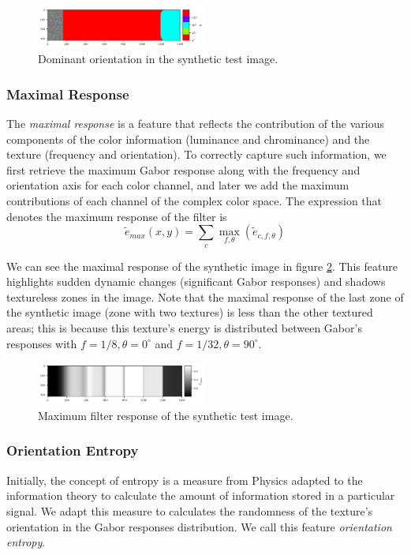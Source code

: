 \documentclass[journal]{IEEEtran}
\begin{document}
\begin{figure}[!ht]
	\includegraphics[width=0.5\textwidth]{dom_orient_synth}
    \caption{Dominant orientation in the synthetic test image.}
    \label{fig:dom_orient_synth}
\end{figure}

\subsubsection{Maximal Response}
The \textit{maximal response} is a feature that reflects the contribution of the various components of the color information (luminance and chrominance) and the texture (frequency and orientation). To correctly capture such information, we first retrieve the maximum Gabor response along with the frequency and orientation axis for each color channel, and later we add the maximum contributions of each channel of the complex color space. The expression that denotes the maximum response of the filter is
\begin{equation}
	\widetilde{e}_{max}(x,y) = \underset{c}{\sum} \underset{f, \theta}{\max} (\widetilde{e}_{c, f, \theta}) \label{eq:max_energy}
\end{equation}

We can see the maximal response of the synthetic image in figure \ref{fig:max_energy_synth}. This feature highlights sudden dynamic changes (significant Gabor responses) and shadows textureless zones in the image. Note that the maximal response of the last zone of the synthetic image (zone with two textures) is less than the other textured areas; this is because this texture's energy is distributed between Gabor's responses with $f=1/8, \theta=0^\circ$ and $f=1/32, \theta=90^\circ$.

\begin{figure}[!ht]
	\includegraphics[width=0.5\textwidth]{max_energy_synth}
    \caption{Maximum filter response of the synthetic test image.}
    \label{fig:max_energy_synth}
\end{figure}

\subsubsection{Orientation Entropy}
Initially, the concept of entropy is a measure from Physics adapted to the information theory to calculate the amount of information stored in a particular signal. We adapt this measure to calculates the randomness of the texture's orientation in the Gabor responses distribution.  We call this feature \textit{orientation entropy}.
\end{document}
